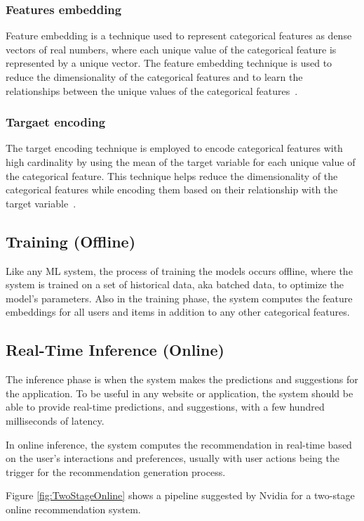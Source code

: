 \subsubsection{Features embedding}
Feature embedding is a technique used to represent categorical features as dense vectors of real numbers, where each unique value of the categorical feature is represented by a unique vector. The feature embedding technique is used to reduce the dimensionality of the categorical features and to learn the relationships between the unique values of the categorical features~\cite{FeatureEmbedding}.
\subsubsection{Targaet encoding}
The target encoding technique is employed to encode categorical features with high cardinality by using the mean of the target variable for each unique value of the categorical feature. This technique helps reduce the dimensionality of the categorical features while encoding them based on their relationship with the target variable~\cite{TargetEncoding}.
\subsection{Training (Offline)}
Like any ML system, the process of training the models occurs offline,
where the system is trained on a set of historical data, aka batched data, to optimize the model's parameters.
Also in the training phase, the system computes the feature embeddings for all users and items in addition to any other categorical features.


\subsection{Real-Time Inference (Online)}
The inference phase is when the system makes the predictions and suggestions for the application.
To be useful in any website or application, 
the system should be able to provide real-time predictions, 
and suggestions, with a few hundred milliseconds of latency.

In online inference, the system computes the recommendation in real-time based on the user's interactions and preferences, 
usually with user actions being the trigger for the recommendation generation process.

Figure \ref{fig:TwoStageOnline} shows a pipeline suggested by Nvidia\cite{NvidiaFeatureStores} for a two-stage online recommendation system.

